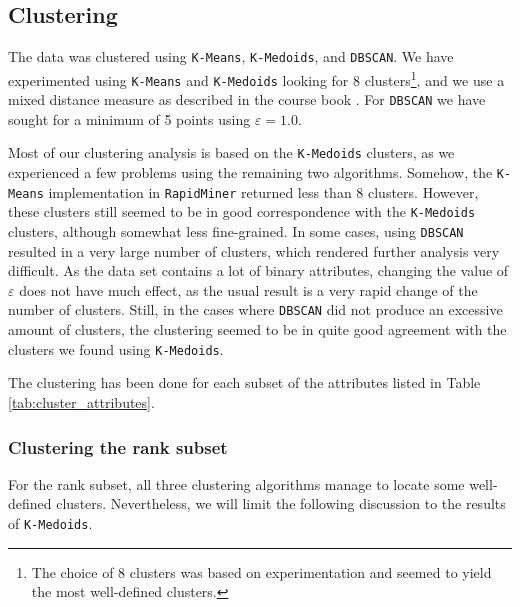 \subsection{Clustering}
\label{subsec:clustering}

The data was clustered using \texttt{K-Means}, \texttt{K-Medoids}, and \texttt{DBSCAN}. We have experimented using \texttt{K-Means} and \texttt{K-Medoids} looking for 8 clusters\footnote{The choice of 8 clusters was based on experimentation and seemed to yield the most well-defined clusters.}, and we use a mixed distance measure as described in the course book \cite{book}. For \texttt{DBSCAN} we have sought for a minimum of 5 points using $\varepsilon = 1.0$.

Most of our clustering analysis is based on the \texttt{K-Medoids} clusters, as we experienced a few problems using the remaining two algorithms. Somehow, the \texttt{K-Means} implementation in \texttt{RapidMiner} returned less than 8 clusters. However, these clusters still seemed to be in good correspondence with the \texttt{K-Medoids} clusters, although somewhat less fine-grained. In some cases, using \texttt{DBSCAN} resulted in a very large number of clusters, which rendered further analysis very difficult. As the data set contains a lot of binary attributes, changing the value of $\varepsilon$ does not have much effect, as the usual result is a very rapid change of the number of clusters. Still, in the cases where \texttt{DBSCAN} did not produce an excessive amount of clusters, the clustering seemed to be in quite good agreement with the clusters we found using \texttt{K-Medoids}.

The clustering has been done for each subset of the attributes listed in Table \ref{tab:cluster_attributes}.

\subsubsection{Clustering the rank subset}

For the rank subset, all three clustering algorithms manage to locate some well-defined clusters. Nevertheless, we will limit the following discussion to the results of \texttt{K-Medoids}. 


